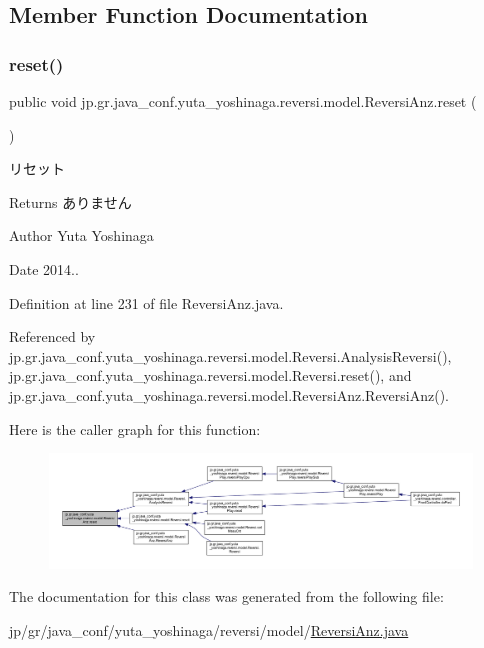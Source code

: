 \subsection{Member Function Documentation}
\mbox{\label{classjp_1_1gr_1_1java__conf_1_1yuta__yoshinaga_1_1reversi_1_1model_1_1_reversi_anz_ab87a68776fedd66e0fa8bed2c24d461b}} 
\subsubsection{\texorpdfstring{reset()}{reset()}}
{\footnotesize\ttfamily public void jp.\+gr.\+java\+\_\+conf.\+yuta\+\_\+yoshinaga.\+reversi.\+model.\+Reversi\+Anz.\+reset (\begin{DoxyParamCaption}{ }\end{DoxyParamCaption})}



リセット 

\begin{DoxyReturn}{Returns}
ありません 
\end{DoxyReturn}
\begin{DoxyAuthor}{Author}
Yuta Yoshinaga 
\end{DoxyAuthor}
\begin{DoxyDate}{Date}
2014.. 
\end{DoxyDate}


Definition at line 231 of file Reversi\+Anz.\+java.



Referenced by jp.\+gr.\+java\+\_\+conf.\+yuta\+\_\+yoshinaga.\+reversi.\+model.\+Reversi.\+Analysis\+Reversi(), jp.\+gr.\+java\+\_\+conf.\+yuta\+\_\+yoshinaga.\+reversi.\+model.\+Reversi.\+reset(), and jp.\+gr.\+java\+\_\+conf.\+yuta\+\_\+yoshinaga.\+reversi.\+model.\+Reversi\+Anz.\+Reversi\+Anz().

Here is the caller graph for this function\+:
\nopagebreak
\begin{figure}[H]
\begin{center}
\leavevmode
\includegraphics[width=350pt]{classjp_1_1gr_1_1java__conf_1_1yuta__yoshinaga_1_1reversi_1_1model_1_1_reversi_anz_ab87a68776fedd66e0fa8bed2c24d461b_icgraph}
\end{center}
\end{figure}


The documentation for this class was generated from the following file\+:\begin{DoxyCompactItemize}
\item 
jp/gr/java\+\_\+conf/yuta\+\_\+yoshinaga/reversi/model/\mbox{\hyperlink{_reversi_anz_8java}{Reversi\+Anz.\+java}}\end{DoxyCompactItemize}

